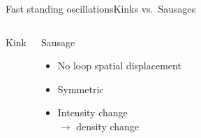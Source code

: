 \documentclass[11pt,table]{beamer}
\begin{document}
\begin{frame}{Fast standing oscillations}{Kinks vs.\ Sausages}
\begin{columns}
\begin{block}{Kink}
\begin{itemize}
            \end{itemize}
        \end{block}
        \begin{block}{Sausage}
            \begin{itemize}
                \item No loop spatial displacement
                \item Symmetric
                \item Intensity change\\ $\rightarrow$ density change
            \end{itemize}
        \end{block}
\end{columns}
\end{frame}%
\end{document}
